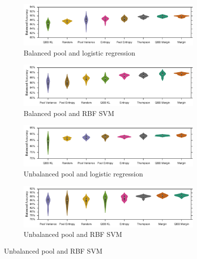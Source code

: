 \begin{figure}[p]
	\centering
	\begin{subfigure}{\textwidth}
		\centering
		\includegraphics[width=\textwidth]{figures/5_active/sdss_bl_ind_violin}
		\caption{Balanced pool and logistic regression}
		\label{fig:sdss_bl_ind_violin}
	\end{subfigure}
	\begin{subfigure}{\textwidth}
		\centering
		\includegraphics[width=\linewidth]{figures/5_active/sdss_br_ind_violin}
		\caption{Balanced pool and RBF SVM}
		\label{fig:sdss_br_ind_violin}
	\end{subfigure}
	\begin{subfigure}{\textwidth}
		\centering
		\includegraphics[width=\textwidth]{figures/5_active/sdss_ul_ind_violin}
		\caption{Unbalanced pool and logistic regression}
		\label{fig:sdss_ul_ind_violin}
	\end{subfigure}
	\begin{subfigure}{\textwidth}
		\centering
		\includegraphics[width=\linewidth]{figures/5_active/sdss_ur_ind_violin}
		\caption{Unbalanced pool and RBF SVM}
		\label{fig:sdss_ur_ind_violin}

\end{subfigure}
\end{figure}

